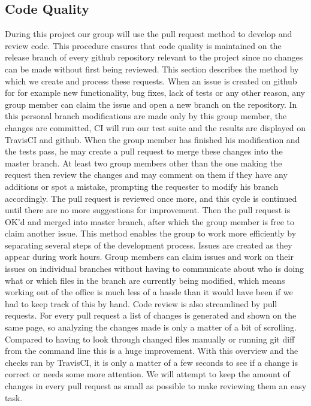 \documentclass[]{article}
\begin{document}
\subsection{Code Quality}
During this project our group will use the pull request method to develop and review code. This procedure ensures that code quality is maintained on the release branch of every github repository relevant to the project since no changes can be made without first being reviewed. This section describes the method by which we create and process these requests.
When an issue is created on github for for example new functionality, bug fixes, lack of tests or any other reason, any group member can claim the issue and open a new branch on the repository. In this personal branch modifications are made only by this group member, the changes are committed, \gls{CI} will run our test suite and the results are displayed on TravisCI and github. When the group member has finished his modification and the tests pass, he may create a pull request to merge these changes into the master branch. At least two group members other than the one making the request then review the changes and may comment on them if they have any additions or spot a mistake, prompting the requester to modify his branch accordingly. The pull request is reviewed once more, and this cycle is continued until there are no more suggestions for improvement. Then the pull request is OK'd and merged into master branch, after which the group member is free to claim another issue. This method enables the group to work more efficiently by separating several steps of the development process. Issues are created as they appear during work hours. Group members can claim issues and work on their issues on individual branches without having to communicate about who is doing what or which files in the branch are currently being modified, which means working out of the office is much less of a hassle than it would have been if we had to keep track of this by hand.
Code review is also streamlined by pull requests. For every pull request a list of changes is generated and shown on the same page, so analyzing the changes made is only a matter of a bit of scrolling. Compared to having to look through changed files manually or running git diff from the command line this is a huge improvement. With this overview and the checks ran by TravisCI, it is only a matter of a few seconds to see if a change is correct or needs some more attention.
We will attempt to keep the amount of changes in every pull request as small as possible to make reviewing them an easy task.
\end{document}
